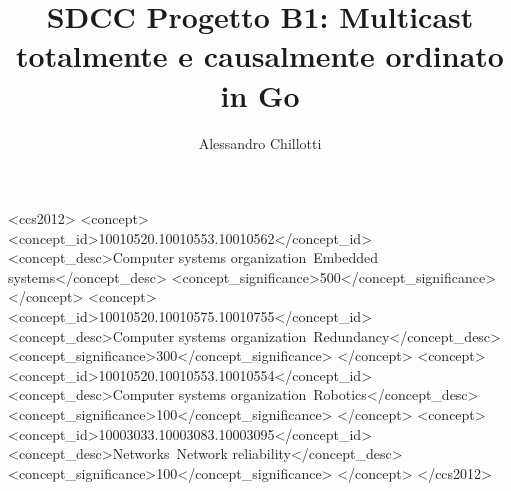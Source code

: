 \documentclass[acmtog]{acmart}
\begin{document}
\title{SDCC Progetto B1: Multicast totalmente e causalmente ordinato in Go}

\author{Alessandro Chillotti}

\begin{abstract}

\end{abstract}

\begin{CCSXML}
<ccs2012>
 <concept>
  <concept_id>10010520.10010553.10010562</concept_id>
  <concept_desc>Computer systems organization~Embedded systems</concept_desc>
  <concept_significance>500</concept_significance>
 </concept>
 <concept>
  <concept_id>10010520.10010575.10010755</concept_id>
  <concept_desc>Computer systems organization~Redundancy</concept_desc>
  <concept_significance>300</concept_significance>
 </concept>
 <concept>
  <concept_id>10010520.10010553.10010554</concept_id>
  <concept_desc>Computer systems organization~Robotics</concept_desc>
  <concept_significance>100</concept_significance>
 </concept>
 <concept>
  <concept_id>10003033.10003083.10003095</concept_id>
  <concept_desc>Networks~Network reliability</concept_desc>
  <concept_significance>100</concept_significance>
 </concept>
</ccs2012>
\end{CCSXML}




\maketitle
\end{document}
